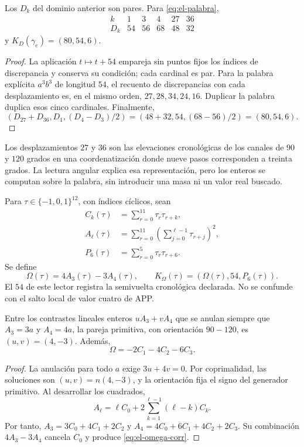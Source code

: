 \begin{lemma}
Los \(D_k\) del dominio anterior son pares. Para
\eqref{eq:el-palabra},
\[
 \begin{array}{c|rrrrr}
 k&1&3&4&27&36\\\hline
 D_k&54&56&68&48&32
 \end{array}
\]
y \(K_D(\gamma_e)=(80,54,6)\).
\end{lemma}
\begin{proof}
La aplicación \(t\mapsto t+54\) empareja sin puntos fijos los índices
de discrepancia y conserva su condición; cada cardinal es par. Para la
palabra explícita \(a^3b^3\) de longitud \(54\), el recuento de
discrepancias con cada desplazamiento es, en el mismo orden,
\(27,28,34,24,16\). Duplicar la palabra duplica esos cinco cardinales.
Finalmente,
\[
 (D_{27}+D_{36},D_1,(D_4-D_3)/2)
 =(48+32,54,(68-56)/2)=(80,54,6).
\]
\end{proof}

Los desplazamientos \(27\) y \(36\) son las elevaciones
cronológicas de los canales de \(90\) y \(120\) grados en una coordenatización
donde nueve pasos corresponden a treinta grados. La lectura angular
explica esa representación, pero los enteros se computan sobre la
palabra, sin introducir una masa ni un valor real buscado.

\begin{definition}
Para \(\tau\in\{-1,0,1\}^{12}\), con índices cíclicos, sean
\begin{align*}
 C_k(\tau)&=\sum_{r=0}^{11}\tau_r\tau_{r+k},\\
 A_\ell(\tau)&=\sum_{r=0}^{11}
           \left(\sum_{j=0}^{\ell-1}\tau_{r+j}\right)^2,\\
 P_6(\tau)&=\sum_{r=0}^{5}\tau_r\tau_{r+6}.
\end{align*}
Se define
\begin{equation}
 \Omega(\tau)=4A_3(\tau)-3A_4(\tau),\qquad
 K_\Omega(\tau)=(\Omega(\tau),54,P_6(\tau)).
 \label{eq:el-komega}
\end{equation}
El \(54\) de este lector registra la semivuelta cronológica declarada.
No se confunde con el salto local de valor cuatro de APP.
\end{definition}

\begin{lemma}
Entre los contrastes lineales enteros \(uA_3+vA_4\) que se anulan
siempre que \(A_3=3a\) y \(A_4=4a\), la pareja primitiva, con
orientación \(90-120\), es \((u,v)=(4,-3)\). Además,
\begin{equation}
 \Omega=-2C_1-4C_2-6C_3.
 \label{eq:el-omega-corr}
\end{equation}
\end{lemma}
\begin{proof}
La anulación para todo \(a\) exige \(3u+4v=0\). Por coprimalidad,
las soluciones son \((u,v)=n(4,-3)\), y la orientación fija el signo
del generador primitivo. Al desarrollar los cuadrados,
\[
 A_\ell=\ell C_0+2\sum_{k=1}^{\ell-1}(\ell-k)C_k.
\]
Por tanto,
\(A_3=3C_0+4C_1+2C_2\) y
\(A_4=4C_0+6C_1+4C_2+2C_3\). Su combinación \(4A_3-3A_4\)
cancela \(C_0\) y produce \eqref{eq:el-omega-corr}.
\end{proof}

